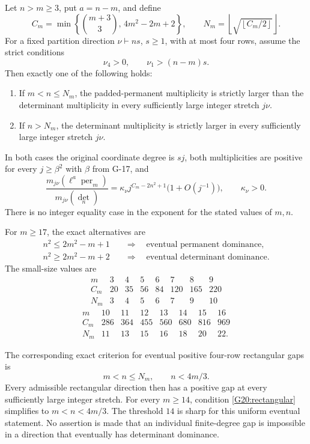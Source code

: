 \begin{theorem}
\label{G-20}
Let $n>m\ge3$, put $a=n-m$, and define
\[
 C_m=\min\left\{\binom{m+3}{3},\,4m^2-2m+2\right\},
 \qquad N_m=\left\lfloor\sqrt{\left\lfloor C_m/2\right\rfloor}\right\rfloor.
\]
For a fixed partition direction $\nu\vdash ns$, $s\ge1$, with
at most four rows, assume the strict conditions
\[
 \nu_4>0,\qquad \nu_1>(n-m)s.
\]
Then exactly one of the following holds:
\begin{enumerate}
\item If $m<n\le N_m$, the padded-permanent multiplicity is
strictly larger than the determinant multiplicity in every
sufficiently large integer stretch $j\nu$.
\item If $n>N_m$, the determinant multiplicity is strictly
larger in every sufficiently large integer stretch $j\nu$.
\end{enumerate}
In both cases the original coordinate degree is $sj$, both
multiplicities are positive for every $j\ge\beta^2$ with
$\beta$ from G-17, and
\begin{equation}\label{G20:exact_ratio}
 \frac{m_{j\nu}(\ell^a\operatorname{per}_m)}
      {m_{j\nu}(\det_n)}
 =\kappa_\nu j^{C_m-2n^2+1}\bigl(1+O(j^{-1})\bigr),
 \qquad \kappa_\nu>0.
\end{equation}
There is no integer equality case in the exponent for the
stated values of $m,n$.

For $m\ge17$, the exact alternatives are
\begin{equation}\label{G20:large_boundary}
 \begin{aligned}
 n^2\le2m^2-m+1&\quad\Longrightarrow\quad
       \text{eventual permanent dominance},\\
 n^2\ge2m^2-m+2&\quad\Longrightarrow\quad
       \text{eventual determinant dominance}.
 \end{aligned}
\end{equation}
The small-size values are
\[
\begin{array}{c|rrrrrrr}
m&3&4&5&6&7&8&9\\ \hline
C_m&20&35&56&84&120&165&220\\
N_m&3&4&5&6&7&9&10
\end{array}
\]
\[
\begin{array}{c|rrrrrrr}
m&10&11&12&13&14&15&16\\ \hline
C_m&286&364&455&560&680&816&969\\
N_m&11&13&15&16&18&20&22.
\end{array}
\]

The corresponding exact criterion for eventual positive
four-row rectangular gaps is
\begin{equation}\label{G20:rectangular}
 m<n\le N_m,\qquad n<4m/3.
\end{equation}
Every admissible rectangular direction then has a positive
gap at every sufficiently large integer stretch. For every
$m\ge14$, condition \eqref{G20:rectangular} simplifies to
$m<n<4m/3$. The threshold $14$ is sharp for this uniform
eventual statement. No assertion is made that an individual
finite-degree gap is impossible in a direction that eventually
has determinant dominance.
\end{theorem}

